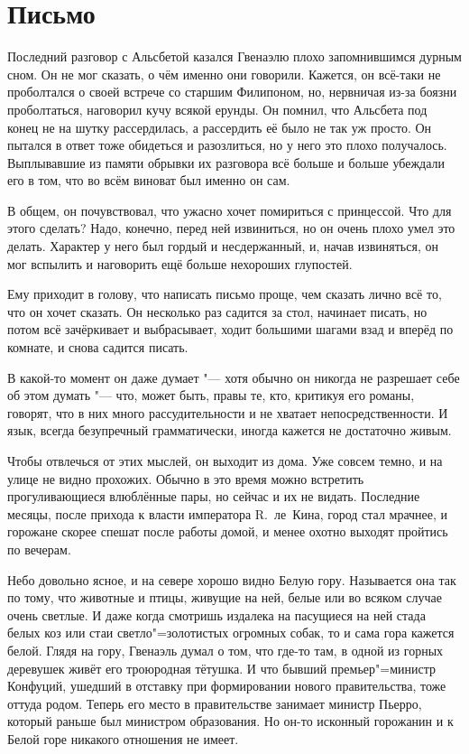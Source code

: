 \section{Письмо}

Последний разговор с Альсбетой казался Гвенаэлю плохо запомнившимся дурным сном.
Он не мог сказать, о чём именно они говорили.
Кажется, он всё-таки не проболтался о своей встрече со старшим Филипоном, но,
нервничая из-за боязни проболтаться, наговорил кучу всякой ерунды.
Он помнил, что Альсбета под конец не на шутку рассердилась, а рассердить её было
не так уж просто.
Он пытался в ответ тоже обидеться и разозлиться, но у него это плохо получалось.
Выплывавшие из памяти обрывки их разговора всё больше и больше убеждали его в
том, что во всём виноват был именно он сам.

В общем, он почувствовал, что ужасно хочет помириться с принцессой.
Что для этого сделать?
Надо, конечно, перед ней извиниться, но он очень плохо умел это делать.
Характер у него был гордый и несдержанный, и, начав извиняться, он мог вспылить
и наговорить ещё больше нехороших глупостей.

Ему приходит в голову, что написать письмо проще, чем сказать лично всё то, что
он хочет сказать.
Он несколько раз садится за стол, начинает писать, но потом всё зачёркивает и
выбрасывает, ходит большими шагами взад и вперёд по комнате, и снова садится
писать.

В какой-то момент он даже думает "--- хотя обычно он никогда не разрешает себе
об этом думать "--- что, может быть, правы те, кто, критикуя его романы, говорят,
что в них много рассудительности и не хватает непосредственности.
И язык, всегда безупречный грамматически, иногда кажется не достаточно живым.

Чтобы отвлечься от этих мыслей, он выходит из дома.
Уже совсем темно, и на улице не видно прохожих.
Обычно в это время можно встретить прогуливающиеся влюблённые пары, но сейчас и
их не видать.
Последние месяцы, после прихода к власти императора R.~ле~Кина, город стал
мрачнее, и горожане скорее спешат после работы домой, и менее охотно выходят
пройтись по вечерам.

Небо довольно ясное, и на севере хорошо видно Белую гору.
Называется она так по тому, что животные и птицы, живущие на ней, белые или во
всяком случае очень светлые.
И даже когда смотришь издалека на пасущиеся на ней стада белых коз или стаи
светло"=золотистых огромных собак, то и сама гора кажется белой.
Глядя на гору, Гвенаэль думал о том, что где-то там, в одной из горных деревушек
живёт его троюродная тётушка.
И что бывший премьер"=министр Конфуций, ушедший в отставку при формировании
нового правительства, тоже оттуда родом.
Теперь его место в правительстве занимает министр Пьерро, который раньше был
министром образования.
Но он-то исконный горожанин и к Белой горе никакого отношения не имеет.


